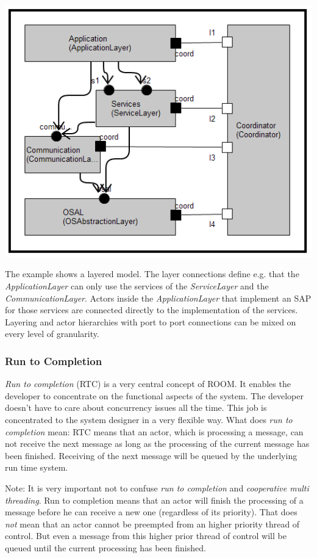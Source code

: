 \includegraphics{images/010-LayerExample.png}

The example shows a layered model. The layer connections define e.g. that the \textit{ApplicationLayer} 
can only use the services of the \textit{ServiceLayer} and the \textit{CommunicationLayer}. Actors inside 
the \textit{ApplicationLayer} that implement an SAP for those services are connected directly to the 
implementation of the services. 
Layering and actor hierarchies with port to port connections can be mixed on every level of granularity. 

\subsubsection*{Run to Completion}
\label{sec:run_to_completion}

\emph{Run to completion} (RTC) is a very central concept of ROOM. It enables the developer to 
concentrate on the functional aspects of the system. The developer doesn't have to care about concurrency 
issues all the time. This job is concentrated to the system designer in a very flexible way.
What does \emph{run to completion} mean:
RTC means that an actor, which is processing a message, can not receive the next message as long as the 
processing of the current message has been finished. Receiving of the next message will be queued by the 
underlying run time system.

Note: It is very important not to confuse \emph{run to completion} and \emph{cooperative multi threading}.
Run to completion means that 
an actor will finish the processing of a message before he can receive a new one (regardless of its 
priority). That does \emph{not} mean that an actor cannot be preempted from an higher priority thread of control. 
But even a message from this higher prior thread of control will be queued until the current processing 
has been finished. 

